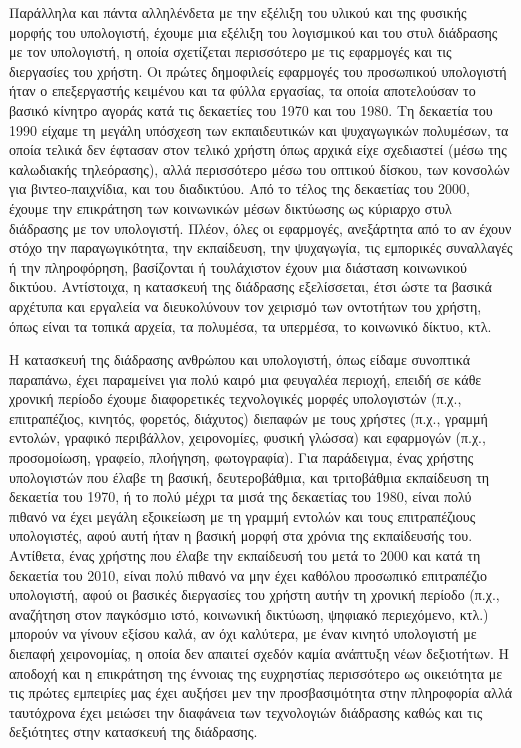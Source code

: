 \documentclass[
]{article}
\begin{document}
Παράλληλα και πάντα αλληλένδετα με την εξέλιξη του υλικού και της
φυσικής μορφής του υπολογιστή, έχουμε μια εξέλιξη του λογισμικού και του
στυλ διάδρασης με τον υπολογιστή, η οποία σχετίζεται περισσότερο με τις
εφαρμογές και τις διεργασίες του χρήστη. Οι πρώτες δημοφιλείς εφαρμογές
του προσωπικού υπολογιστή ήταν ο επεξεργαστής κειμένου και τα φύλλα
εργασίας, τα οποία αποτελούσαν το βασικό κίνητρο αγοράς κατά τις
δεκαετίες του 1970 και του 1980. Τη δεκαετία του 1990 είχαμε τη μεγάλη
υπόσχεση των εκπαιδευτικών και ψυχαγωγικών πολυμέσων, τα οποία τελικά
δεν έφτασαν στον τελικό χρήστη όπως αρχικά είχε σχεδιαστεί (μέσω της
καλωδιακής τηλεόρασης), αλλά περισσότερο μέσω του οπτικού δίσκου, των
κονσολών για βιντεο-παιχνίδια, και του διαδικτύου. Από το τέλος της
δεκαετίας του 2000, έχουμε την επικράτηση των κοινωνικών μέσων δικτύωσης
ως κύριαρχο στυλ διάδρασης με τον υπολογιστή. Πλέον, όλες οι εφαρμογές,
ανεξάρτητα από το αν έχουν στόχο την παραγωγικότητα, την εκπαίδευση, την
ψυχαγωγία, τις εμπορικές συναλλαγές ή την πληροφόρηση, βασίζονται ή
τουλάχιστον έχουν μια διάσταση κοινωνικού δικτύου. Αντίστοιχα, η
κατασκευή της διάδρασης εξελίσσεται, έτσι ώστε τα βασικά αρχέτυπα και
εργαλεία να διευκολύνουν τον χειρισμό των οντοτήτων του χρήστη, όπως
είναι τα τοπικά αρχεία, τα πολυμέσα, τα υπερμέσα, το κοινωνικό δίκτυο,
κτλ.

Η κατασκευή της διάδρασης ανθρώπου και υπολογιστή, όπως είδαμε συνοπτικά
παραπάνω, έχει παραμείνει για πολύ καιρό μια φευγαλέα περιοχή, επειδή σε
κάθε χρονική περίοδο έχουμε διαφορετικές τεχνολογικές μορφές υπολογιστών
(π.χ., επιτραπέζιος, κινητός, φορετός, διάχυτος) διεπαφών με τους
χρήστες (π.χ., γραμμή εντολών, γραφικό περιβάλλον, χειρονομίες, φυσική
γλώσσα) και εφαρμογών (π.χ., προσομοίωση, γραφείο, πλοήγηση,
φωτογραφία). Για παράδειγμα, ένας χρήστης υπολογιστών που έλαβε τη
βασική, δευτεροβάθμια, και τριτοβάθμια εκπαίδευση τη δεκαετία του 1970,
ή το πολύ μέχρι τα μισά της δεκαετίας του 1980, είναι πολύ πιθανό να
έχει μεγάλη εξοικείωση με τη γραμμή εντολών και τους επιτραπέζιους
υπολογιστές, αφού αυτή ήταν η βασική μορφή στα χρόνια της εκπαίδευσής
του. Αντίθετα, ένας χρήστης που έλαβε την εκπαίδευσή του μετά το 2000
και κατά τη δεκαετία του 2010, είναι πολύ πιθανό να μην έχει καθόλου
προσωπικό επιτραπέζιο υπολογιστή, αφού οι βασικές διεργασίες του χρήστη
αυτήν τη χρονική περίοδο (π.χ., αναζήτηση στον παγκόσμιο ιστό, κοινωνική
δικτύωση, ψηφιακό περιεχόμενο, κτλ.) μπορούν να γίνουν εξίσου καλά, αν
όχι καλύτερα, με έναν κινητό υπολογιστή με διεπαφή χειρονομίας, η οποία
δεν απαιτεί σχεδόν καμία ανάπτυξη νέων δεξιοτήτων. Η αποδοχή και η
επικράτηση της έννοιας της ευχρηστίας περισσότερο ως οικειότητα με τις
πρώτες εμπειρίες μας έχει αυξήσει μεν την προσβασιμότητα στην πληροφορία
αλλά ταυτόχρονα έχει μειώσει την διαφάνεια των τεχνολογιών διάδρασης
καθώς και τις δεξιότητες στην κατασκευή της διάδρασης.
\end{document}
